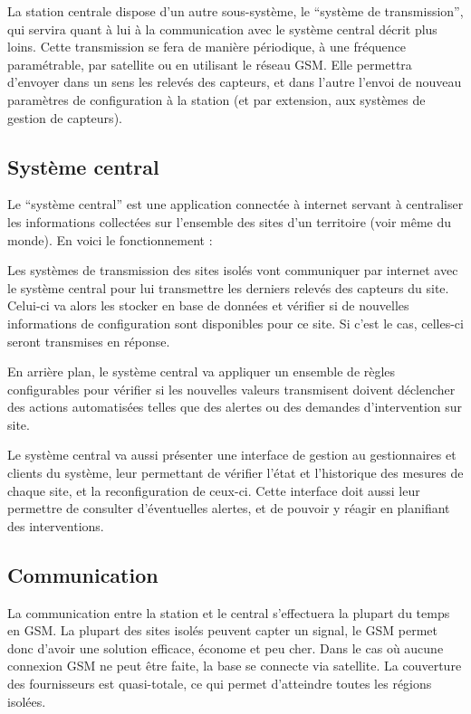 La station centrale dispose d'un autre sous-système, le ``système de transmission'', qui servira quant à lui à la communication avec le système central décrit plus loins. Cette transmission se fera de manière périodique, à une fréquence paramétrable, par satellite ou en utilisant le réseau GSM. Elle permettra d'envoyer dans un sens les relevés des capteurs, et dans l'autre l'envoi de nouveau paramètres de configuration à la station (et par extension, aux systèmes de gestion de capteurs).

\subsection{Système central}

Le ``système central'' est une application connectée à internet servant à centraliser les informations collectées sur l'ensemble des sites d'un territoire (voir même du monde). En voici le fonctionnement :

Les systèmes de transmission des sites isolés vont communiquer par internet avec le système central pour lui transmettre les derniers relevés des capteurs du site. Celui-ci va alors les stocker en base de données et vérifier si de nouvelles informations de configuration sont disponibles pour ce site. Si c'est le cas, celles-ci seront transmises en réponse.

En arrière plan, le système central va appliquer un ensemble de règles configurables pour vérifier si les nouvelles valeurs transmisent doivent déclencher des actions automatisées telles que des alertes ou des demandes d'intervention sur site.

Le système central va aussi présenter une interface de gestion au gestionnaires et clients du système, leur permettant de vérifier l'état et l'historique des mesures de chaque site, et la reconfiguration de ceux-ci. Cette interface doit aussi leur permettre de consulter d'éventuelles alertes, et de pouvoir y réagir en planifiant des interventions.

\subsection{Communication}

La communication entre la station et le central s’effectuera la plupart du temps en GSM. La plupart des sites isolés peuvent capter un signal, le GSM permet donc d’avoir une solution efficace, économe et peu cher. Dans le cas où aucune connexion GSM ne peut être faite, la base se connecte via satellite. La couverture des fournisseurs est quasi-totale, ce qui permet d’atteindre toutes les régions isolées. 

